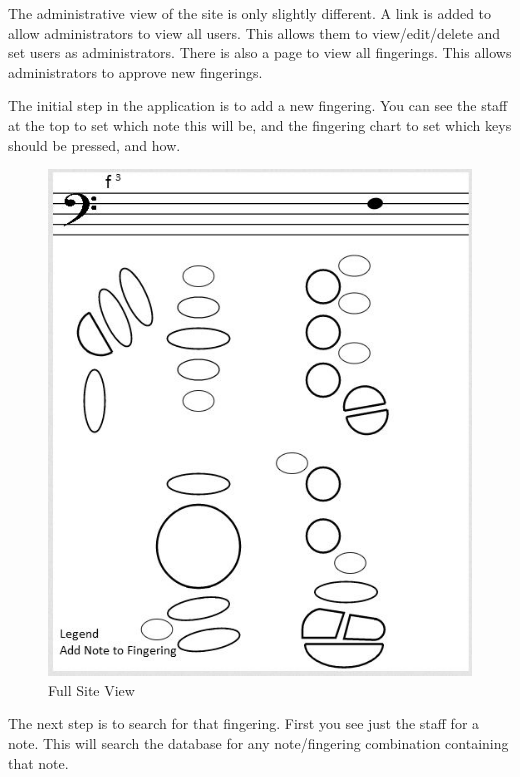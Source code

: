 \documentclass[12pt,english]{article}
\begin{document}
The administrative view of the site is only slightly different. A link is added to allow administrators to view all users.  This allows them to view/edit/delete and set users as administrators. There is also a page to view all fingerings.  This allows
administrators to approve new fingerings.

The initial step in the application is to add a new fingering. You can see the
staff at the top to set which note this will be, and the fingering chart to
set which keys should be pressed, and how.

\begin{figure}[H]
\caption{Full Site View}
\includegraphics[scale=0.75]{3} 
\end{figure}

The next step is to search for that fingering.  First you see just the staff
for a note. This will search the database for any note/fingering combination
containing that note.
\end{document}
